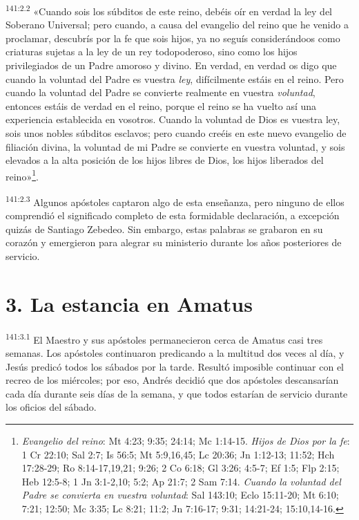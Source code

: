 \par
\textsuperscript{141:2.2} «Cuando sois los súbditos de este reino, debéis oír en verdad la ley del Soberano Universal; pero cuando, a causa del evangelio del reino que he venido a proclamar, descubrís por la fe que sois hijos, ya no seguís considerándoos como criaturas sujetas a la ley de un rey todopoderoso, sino como los hijos privilegiados de un Padre amoroso y divino. En verdad, en verdad os digo que cuando la voluntad del Padre es vuestra \textit{ley}, difícilmente estáis en el reino. Pero cuando la voluntad del Padre se convierte realmente en vuestra \textit{voluntad}, entonces estáis de verdad en el reino, porque el reino se ha vuelto así una experiencia establecida en vosotros. Cuando la voluntad de Dios es vuestra ley, sois unos nobles súbditos esclavos; pero cuando creéis en este nuevo evangelio de filiación divina, la voluntad de mi Padre se convierte en vuestra voluntad, y sois elevados a la alta posición de los hijos libres de Dios, los hijos liberados del reino»\footnote{\textit{Evangelio del reino}: Mt 4:23; 9:35; 24:14; Mc 1:14-15. \textit{Hijos de Dios por la fe}: 1 Cr 22:10; Sal 2:7; Is 56:5; Mt 5:9,16,45; Lc 20:36; Jn 1:12-13; 11:52; Hch 17:28-29; Ro 8:14-17,19,21; 9:26; 2 Co 6:18; Gl 3:26; 4:5-7; Ef 1:5; Flp 2:15; Heb 12:5-8; 1 Jn 3:1-2,10; 5:2; Ap 21:7; 2 Sam 7:14. \textit{Cuando la voluntad del Padre se convierta en vuestra voluntad}: Sal 143:10; Eclo 15:11-20; Mt 6:10; 7:21; 12:50; Mc 3:35; Lc 8:21; 11:2; Jn 7:16-17; 9:31; 14:21-24; 15:10,14-16.}.

\par
\textsuperscript{141:2.3} Algunos apóstoles captaron algo de esta enseñanza, pero ninguno de ellos comprendió el significado completo de esta formidable declaración, a excepción quizás de Santiago Zebedeo. Sin embargo, estas palabras se grabaron en su corazón y emergieron para alegrar su ministerio durante los años posteriores de servicio.

\section*{3. La estancia en Amatus}
\par
\textsuperscript{141:3.1} El Maestro y sus apóstoles permanecieron cerca de Amatus casi tres semanas. Los apóstoles continuaron predicando a la multitud dos veces al día, y Jesús predicó todos los sábados por la tarde. Resultó imposible continuar con el recreo de los miércoles; por eso, Andrés decidió que dos apóstoles descansarían cada día durante seis días de la semana, y que todos estarían de servicio durante los oficios del sábado.

